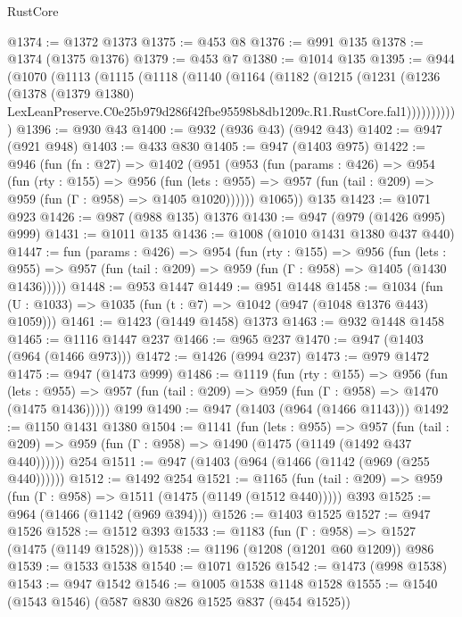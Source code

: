 \begin{lexlean}{RustCore}
\begin{coremodule}
@1374 := @1372 @1373
@1375 := @453 @8
@1376 := @991 @135
@1378 := @1374 (@1375 @1376)
@1379 := @453 @7
@1380 := @1014 @135
@1395 := @944
    (@1070
      (@1113
        (@1115
          (@1118
            (@1140
              (@1164
                (@1182
                  (@1215
                    (@1231
                      (@1236
                        (@1378
                          (@1379 @1380)
                          LexLeanPreserve.C0e25b979d286f42fbe95598b8db1209c.R1.RustCore.fal1)))))))))))
@1396 := @930 @43
@1400 := @932 (@936 @43) (@942 @43)
@1402 := @947 (@921 @948)
@1403 := @433 @830
@1405 := @947 (@1403 @975)
@1422 := @946
    (fun (fn : @27) =>
    @1402
      (@951
        (@953
          (fun (params : @426) =>
          @954
            (fun (rty : @155) =>
            @956
              (fun (lets : @955) =>
              @957 (fun (tail : @209) => @959 (fun (Γ : @958) => @1405 @1020))))))
        @1065))
    @135
@1423 := @1071 @923
@1426 := @987 (@988 @135) @1376
@1430 := @947 (@979 (@1426 @995) @999)
@1431 := @1011 @135
@1436 := @1008 (@1010 @1431 @1380 @437 @440)
@1447 := fun (params : @426) =>
  @954
    (fun (rty : @155) =>
    @956
      (fun (lets : @955) =>
      @957 (fun (tail : @209) => @959 (fun (Γ : @958) => @1405 (@1430 @1436)))))
@1448 := @953 @1447
@1449 := @951 @1448
@1458 := @1034 (fun (U : @1033) => @1035 (fun (t : @7) => @1042 (@947 (@1048 @1376 @443) @1059)))
@1461 := @1423 (@1449 @1458) @1373
@1463 := @932 @1448 @1458
@1465 := @1116 @1447 @237
@1466 := @965 @237
@1470 := @947 (@1403 (@964 (@1466 @973)))
@1472 := @1426 (@994 @237)
@1473 := @979 @1472
@1475 := @947 (@1473 @999)
@1486 := @1119
    (fun (rty : @155) =>
    @956
      (fun (lets : @955) =>
      @957 (fun (tail : @209) => @959 (fun (Γ : @958) => @1470 (@1475 @1436)))))
    @199
@1490 := @947 (@1403 (@964 (@1466 @1143)))
@1492 := @1150 @1431 @1380
@1504 := @1141
    (fun (lets : @955) =>
    @957 (fun (tail : @209) => @959 (fun (Γ : @958) => @1490 (@1475 (@1149 (@1492 @437 @440))))))
    @254
@1511 := @947 (@1403 (@964 (@1466 (@1142 (@969 (@255 @440))))))
@1512 := @1492 @254
@1521 := @1165
    (fun (tail : @209) => @959 (fun (Γ : @958) => @1511 (@1475 (@1149 (@1512 @440)))))
    @393
@1525 := @964 (@1466 (@1142 (@969 @394)))
@1526 := @1403 @1525
@1527 := @947 @1526
@1528 := @1512 @393
@1533 := @1183 (fun (Γ : @958) => @1527 (@1475 (@1149 @1528)))
@1538 := @1196 (@1208 (@1201 @60 @1209)) @986
@1539 := @1533 @1538
@1540 := @1071 @1526
@1542 := @1473 (@998 @1538)
@1543 := @947 @1542
@1546 := @1005 @1538 @1148 @1528
@1555 := @1540 (@1543 @1546) (@587 @830 @826 @1525 @837 (@454 @1525))

\end{coremodule}
\end{lexlean}
